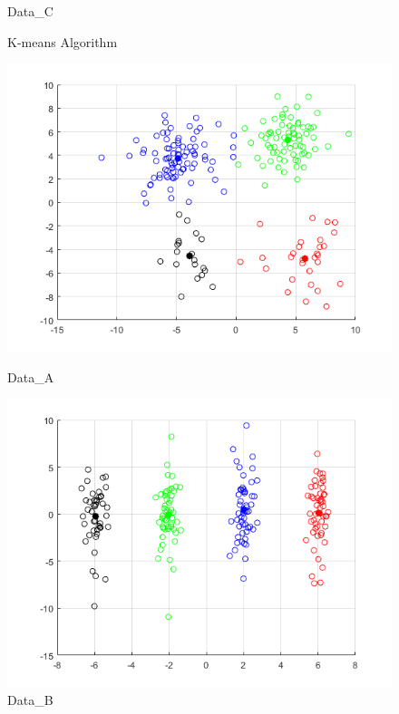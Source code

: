 \documentclass[12pt]{article}
\begin{document}
\begin{figure}[H]
  \caption{Data\_C}\label{fig:kmeans-c}
\endminipage
\caption{K-means Algorithm}
\end{figure}

\begin{figure}[H]
	  \includegraphics[width=\linewidth]{figs/1-b-em-a.png}
	  \caption{Data\_A}\label{fig:kmeans-a}
	\endminipage\hfill
	  \includegraphics[width=\linewidth]{figs/1-b-em-b.png}
	  \caption{Data\_B}\label{fig:kmeans-b}
	\endminipage\hfill

\end{figure}
\end{document}
